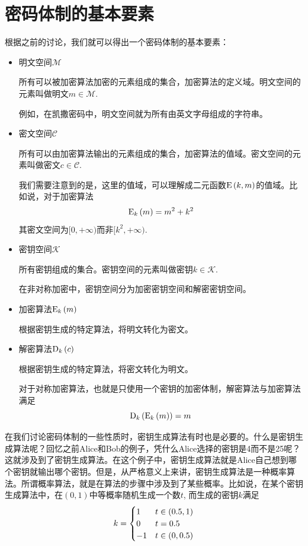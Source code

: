 \section{密码体制的基本要素}
根据之前的讨论，我们就可以得出一个密码体制的基本要素：
\begin{itemize}
    \item 明文空间$\mathcal{M}$\par
    所有可以被加密算法加密的元素组成的集合，加密算法的定义域。明文空间的元素叫做明文$m\in\mathcal{M}$.\par
    例如，在凯撒密码中，明文空间就为所有由英文字母组成的字符串。
    \item 密文空间$\mathcal{C}$\par
    所有可以由加密算法输出的元素组成的集合，加密算法的值域。密文空间的元素叫做密文$c\in\mathcal{C}$.\par
    我们需要注意到的是，这里的值域，可以理解成二元函数$\mathrm{E}\left( {k, m}\right)$的值域。比如说，对于加密算法
    \[{\mathrm{E}_{k}\left({m}\right)}=m^2+k^2\]
    其密文空间为$[0, +\infty)$而非$[k^2, +\infty)$.
    \item 密钥空间$\mathcal{K}$\par
    所有密钥组成的集合。密钥空间的元素叫做密钥$k\in\mathcal{K}$.\par
    在非对称加密中，密钥空间分为加密密钥空间和解密密钥空间。
    \item 加密算法${\mathrm{E}_{k}\left({m}\right)}$\par
    根据密钥生成的特定算法，将明文转化为密文。
    \item 解密算法${\mathrm{D}_{k}\left({c}\right)}$\par
    根据密钥生成的特定算法，将密文转化为明文。\par
    对于对称加密算法，也就是只使用一个密钥的加密体制，解密算法与加密算法满足
    \[{\mathrm{D}_{k}\left({{\mathrm{E}_{k}\left({m}\right)}}\right)}=m\]
\end{itemize}

在我们讨论密码体制的一些性质时，密钥生成算法有时也是必要的。什么是密钥生成算法呢？回忆之前Alice和Bob的例子，凭什么Alice选择的密钥是4而不是25呢？这就涉及到了密钥生成算法。在这个例子中，密钥生成算法就是Alice自己想到哪个密钥就输出哪个密钥。但是，从严格意义上来讲，密钥生成算法是一种概率算法。所谓概率算法，就是在算法的步骤中涉及到了某些概率。比如说，在某个密钥生成算法中，在$(0, 1)$中等概率随机生成一个数$t$, 而生成的密钥$k$满足
\[
    k=\begin{cases}1&t\in\left( {0.5, 1}\right)\\0&t=0.5\\-1&t\in\left( {0, 0.5}\right)\end{cases}
\]

